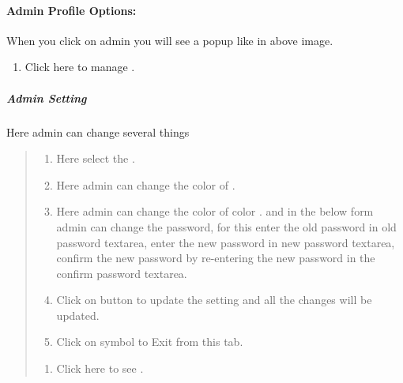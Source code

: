 \documentclass[a4paper,10pt,english]{report}
\begin{document}
\paragraph{Admin Profile Options:}
\label{\detokenize{adminprofileoptions:admin-profile-options}}\label{\detokenize{adminprofileoptions:id1}}\label{\detokenize{adminprofileoptions::doc}}
\begin{figure}[htbp]
\centering

\noindent{}
\end{figure}

When you click on admin you will see a popup like in above image.
\begin{enumerate}
\def\theenumi{\arabic{enumi}}
\def\labelenumi{\theenumi .}
\makeatletter\def\p@enumii{\p@enumi \theenumi .}\makeatother
\item {} 
Click here to manage  .

\end{enumerate}


\subparagraph{Admin Setting}
\label{\detokenize{adminprofileoptions:admin-setting}}\label{\detokenize{adminprofileoptions:id2}}
\begin{figure}[htbp]
\centering

\noindent{}
\end{figure}

Here admin can change several things
\begin{quote}
\begin{enumerate}
\def\theenumi{\alph{enumi}}
\def\labelenumi{\theenumi .}
\makeatletter\def\p@enumii{\p@enumi \theenumi .}\makeatother
\item {} 
Here select the  .

\item {} 
Here admin can change the color of  .

\item {} 
Here admin can change the color of  color . and in the below form admin can change the password, for this enter the old password in old password textarea, enter the new password in new password textarea, confirm the new password by re-entering the new password in the confirm password textarea.

\item {} 
Click on  button to update the setting and all the changes will be updated.

\item {} 
Click on  symbol to Exit from this tab.

\end{enumerate}
\begin{enumerate}
\def\theenumi{\arabic{enumi}}
\def\labelenumi{\theenumi .}
\makeatletter\def\p@enumii{\p@enumi \theenumi .}\makeatother
\setcounter{enumi}{1}
\item {} 
Click here to see  .

\end{enumerate}
\end{quote}
\end{document}
